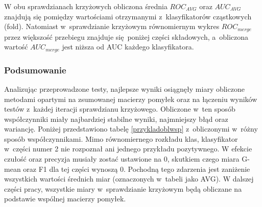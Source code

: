\par
W obu sprawdzianach krzyżowych obliczona średnia $ROC_{AVG}$ oraz $AUC_{AVG}$ znajdują się pomiędzy wartościami otrzymanymi z~klasyfikatorów cząstkowych (fold). Natomiast w~sprawdzianie krzyżowym równomiernym wykres $ROC_{merge}$ przez większość przebiegu znajduje się poniżej części składowych, a~obliczona wartość $AUC_{merge}$ jest niższa od AUC każdego klasyfikatora.


\subsubsection{Podsumowanie}
Analizując przeprowadzone testy, najlepsze wyniki osiągnęły miary obliczone metodami opartymi na zsumowanej macierzy pomyłek oraz na łączeniu wyników testów z~każdej iteracji sprawdzianu krzyżowego. Obliczone w~ten sposób współczynniki miały najbardziej stabilne wyniki, najmniejszy błąd oraz wariancję. Poniżej przedstawiono tabelę \ref{przykladoblwsp} z~obliczonymi w~różny sposób współczynnikami. Mimo równomiernego rozkładu klas, klasyfikator w~części numer 2 nie rozpoznał ani jednego przykładu pozytywnego. W efekcie czułość oraz precyzja musiały zostać ustawione na 0, skutkiem czego miara G-mean oraz F1 dla tej części wynoszą 0. Pochodną tego zdarzenia jest zaniżenie wszystkich wartości średnich miar (oznaczonych w~tabeli jako AVG). W dalszej części pracy, wszystkie miary w~sprawdzianie krzyżowym będą obliczane na podstawie wspólnej macierzy pomyłek. 
